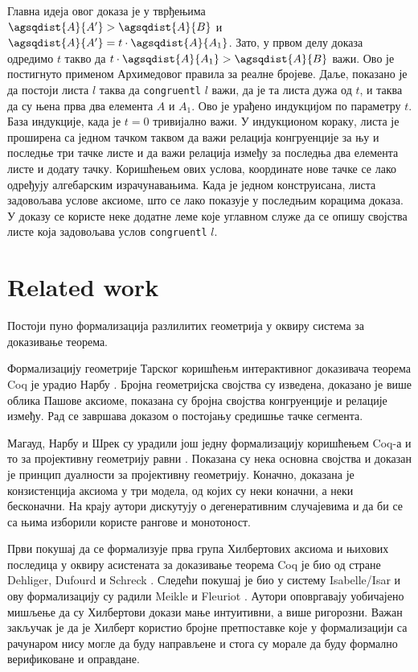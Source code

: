 Главна идеја овог доказа је у тврђењима $\agsqdist{A}{A'} >
\agsqdist{A}{B}$ и $\agsqdist{A}{A'} = t\cdot
\agsqdist{A}{A_1}$. Зато, у првом делу доказа одредимо $t$ такво да
$t\cdot \agsqdist{A}{A_1} > \agsqdist{A}{B}$ важи. Ово је постигнуто
применом Архимедовог правила за реалне бројеве. Даље, показано је да
постоји листа $l$ таква да \verb|congruentl| $l$ важи, да је та листа
дужа од $t$, и таква да су њена прва два елемента $A$ и $A_1$. Ово је
урађено индукцијом по параметру $t$. База индукције, када је $t = 0$
тривијално важи. У индукционом кораку, листа је проширена са једном
тачком таквом да важи релација конгруенције за њу и последње три тачке
листе и да важи релација између за последња два елемента листе и
додату тачку. Коришћењем ових услова, координате нове тачке се лако
одређују алгебарским израчунавањима. Када је једном конструисана,
листа задовољава услове аксиоме, што се лако показује у последњим
корацима доказа. У доказу се користе неке додатне леме које углавном
служе да се опишу својства листе која задовољава услов
\verb|congruentl| $l$.


\section{Related work}
\label{sec:related}

Постоји пуно формализација разлилитих геометрија у оквиру система за
доказивање теорема.

Формализацију геометрије Тарског коришћењм интерактивног доказивача
теорема Coq је урадио Нарбу \cite{narboux}. Бројна геометријска
својства су изведена, доказано је више облика Пашове аксиоме, показана
су бројна својства конгруенције и релације између. Рад се завршава
доказом о постојању средишње тачке сегмента.

Магауд, Нарбу и Шрек су урадили још једну формализацију коришћењем
Coq-а и то за пројективну геометрију равни
\cite{projective-coq1,projective-coq2}. Показана су нека основна
својства и доказан је принцип дуалности за пројективну
геометрију. Коначно, доказана је конзистенција аксиома у три модела,
од којих су неки коначни, а неки бесконачни. На крају аутори дискутују
о дегенеративним случајевима и да би се са њима изборили користе
рангове и монотоност.

Први покушај да се формализује прва група Хилбертових аксиома и
њихових последица у оквиру асистената за доказивање теорема Coq је био
од стране Dehliger, Dufourd и Schreck \cite{hilbert-coq}. Следећи
покушај је био у систему Isabelle/Isar и ову формализацију су радили
Meikle и Fleuriot \cite{hilbert-isabelle}. Аутори оповргавају
уобичајено мишљење да су Хилбертови докази мање интуитивни, а више
ригорозни. Важан закључак је да је Хилберт користио бројне
претпоставке које у формализацији са рачунаром нису могле да буду
направљене и стога су морале да буду формално верификоване и
оправдане.

